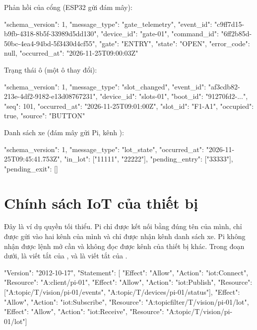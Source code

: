 Phản hồi của cổng (ESP32 gửi đám mây):
\begin{lenh}
{"schema_version": 1, "message_type": "gate_telemetry",
 "event_id": "c9ff7d15-b9fb-4318-8b5f-33989d5dd130",
 "device_id": "gate-01",
 "command_id": "6ff2b85d-50bc-4ea4-94bd-5f3430d4cf55",
 "gate": "ENTRY", "state": "OPEN", "error_code": null,
 "occurred_at": "2026-11-25T09:00:03Z"}
\end{lenh}

Trạng thái ô (một ô thay đổi):
\begin{lenh}
{"schema_version": 1, "message_type": "slot_changed",
 "event_id": "af3cdb82-213e-4df2-9182-e13d08767231",
 "device_id": "slots-01", "boot_id": "91270fd2-...", "seq": 101,
 "occurred_at": "2026-11-25T09:01:00Z",
 "slot_id": "F1-A1", "occupied": true, "source": "BUTTON"}
\end{lenh}

Danh sách xe (đám mây gửi Pi, kênh ):
\begin{lenh}
{"schema_version": 1, "message_type": "lot_state",
 "occurred_at": "2026-11-25T09:45:41.753Z",
 "in_lot": ["11111", "22222"],
 "pending_entry": ["33333"], "pending_exit": []}
\end{lenh}

\chapter{Chính sách IoT của thiết bị }

Đây là ví dụ quyền tối thiểu. Pi chỉ được kết nối bằng đúng tên của mình, chỉ được gửi vào hai kênh của mình và chỉ được nhận kênh danh sách xe. Pi không nhận được lệnh mở cần và không đọc được kênh của thiết bị khác. Trong đoạn dưới,  là viết tắt của , và  là viết tắt của .

\begin{lenh}
{"Version": "2012-10-17", "Statement": [
  {"Effect": "Allow", "Action": "iot:Connect",
   "Resource": "A:client/pi-01"},
  {"Effect": "Allow", "Action": "iot:Publish",
   "Resource": ["A:topic/T/vision/pi-01/events",
                "A:topic/T/devices/pi-01/status"]},
  {"Effect": "Allow", "Action": "iot:Subscribe",
   "Resource": "A:topicfilter/T/vision/pi-01/lot"},
  {"Effect": "Allow", "Action": "iot:Receive",
   "Resource": "A:topic/T/vision/pi-01/lot"}]}
\end{lenh}
